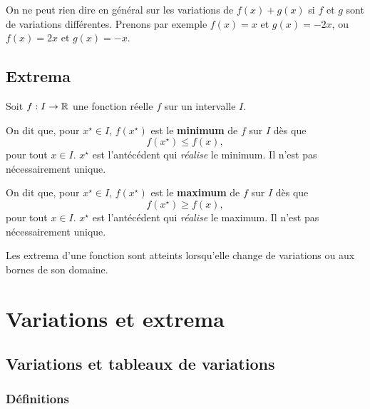\documentclass[a4paper, 12pt]{report}
\begin{document}
\begin{rmq}
	On ne peut rien dire en général sur les variations de $f(x)+g(x)$ si $f$ et $g$ sont de variations différentes.
	Prenons par exemple $f(x) = x$ et $g(x) = -2x$, ou $f(x) = 2x$ et $g(x) = -x$.
\end{rmq}

\section{Extrema}

\begin{defn}
	Soit $f : I \rightarrow \mathbb{R}$ une fonction réelle $f$ sur un intervalle $I$.
	
	On dit que, pour $x^\star \in I$, $f(x^\star)$ est le \textbf{minimum} de $f$ sur $I$ dès que
		\[ f(x^\star) \leq f(x), \]
	pour tout $x\in I$.
	$x^\star$ est l'antécédent qui \emph{réalise} le minimum. Il n'est pas nécessairement unique.
	
	On dit que, pour $x^\star \in I$, $f(x^\star)$ est le \textbf{maximum} de $f$ sur $I$ dès que
		\[ f(x^\star) \geq f(x), \]
	pour tout $x\in I$.
	$x^\star$ est l'antécédent qui \emph{réalise} le maximum. Il n'est pas nécessairement unique.
\end{defn}

\begin{prop}
	Les extrema d'une fonction sont atteints lorsqu'elle change de variations ou aux bornes de son domaine.
\end{prop}

\chapter{Variations et extrema}
\label{chap:variations}


\section{Variations et tableaux de variations}

\subsection{Définitions}
\end{document}
